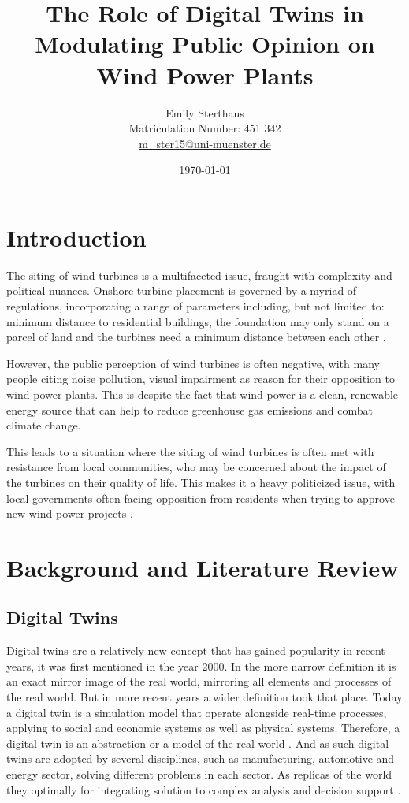 \documentclass[11pt, titlepage, a4paper]{scrartcl}
\title{The Role of Digital Twins in Modulating Public Opinion on Wind Power Plants}
\author{Emily Sterthaus \\ Matriculation Number: 451 342 \\ \href{mailto:m_ster15@uni-muenster.de}{m\_ster15@uni-muenster.de}}
\affil{Institute of Geoinformatics, University of Münster}
\date{\today}
\begin{document}
\maketitle


\newpage
\tableofcontents
\newpage
\begin{linenumbers}
    \section{Introduction}
    The siting of wind turbines is a multifaceted issue, fraught with complexity and political nuances. Onshore
    turbine placement is governed by a myriad of regulations, incorporating a range of parameters including, but not
    limited to: minimum distance to residential buildings, the foundation may only stand on a parcel of land and the
    turbines need a minimum distance between each other
    \cite{niedersachsischesministeriumfurumweltenergieundklimaschutzPlanungUndGenehmigung2021}.

    However, the public perception of wind turbines is often negative, with many people citing noise pollution, visual impairment as reason for their opposition to wind power plants. This is despite the fact that wind power is a clean, renewable energy source that can help to reduce greenhouse gas emissions and combat climate change.

    This leads to a situation where the siting of wind turbines is often met with resistance from local communities, who may be concerned about the impact of the turbines on their quality of life. This makes it a heavy politicized issue, with local governments often facing opposition from residents when trying to approve new wind power projects \cite{kwasniewskiWindenergieVerhindertAntiWindkraftBewegung2021}.


    \section{Background and Literature Review}
    \subsection{Digital Twins}
    Digital twins are a relatively new concept that has gained popularity in recent years, it was first  mentioned in the year 2000. In the more narrow definition it is an exact mirror image of the real world, mirroring all elements and processes of the real world. But in more recent years a wider definition took that place. Today a digital twin is a simulation model that operate alongside real-time processes, applying to social and economic systems as well as physical systems. Therefore, a digital twin is an abstraction or a model of the real world \cite{battyDigitalTwins2018}.
    And as such digital twins are adopted by several disciplines, such as manufacturing, automotive and energy sector, solving different problems in each sector. As replicas of the world they optimally for integrating solution to complex analysis and decision support \cite{pylianidisIntroducingDigitalTwins2021}.

\end{linenumbers}
\end{document}
